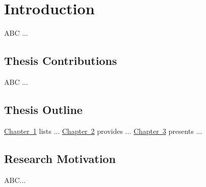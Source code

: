 \chapter{Introduction}

ABC ...

\section{Thesis Contributions}

ABC ...

\section{Thesis Outline}

\hyperlink{chapter.1}{Chapter~1} lists ...
\hyperlink{chapter.2}{Chapter~2} provides ...
\hyperlink{chapter.3}{Chapter~3} presents ...

\section{Research Motivation}

ABC...